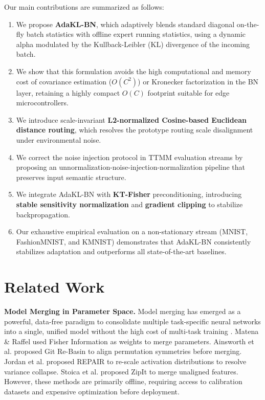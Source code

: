 \documentclass{article}
\begin{document}
Our main contributions are summarized as follows:
\begin{enumerate}
    \item We propose \textbf{AdaKL-BN}, which adaptively blends standard diagonal on-the-fly batch statistics with offline expert running statistics, using a dynamic alpha modulated by the Kullback-Leibler (KL) divergence of the incoming batch.
    \item We show that this formulation avoids the high computational and memory cost of covariance estimation ($O(C^2)$) or Kronecker factorization in the BN layer, retaining a highly compact $O(C)$ footprint suitable for edge microcontrollers.
    \item We introduce scale-invariant \textbf{L2-normalized Cosine-based Euclidean distance routing}, which resolves the prototype routing scale disalignment under environmental noise.
    \item We correct the noise injection protocol in TTMM evaluation streams by proposing an unnormalization-noise-injection-normalization pipeline that preserves input semantic structure.
    \item We integrate AdaKL-BN with \textbf{KT-Fisher} preconditioning, introducing \textbf{stable sensitivity normalization} and \textbf{gradient clipping} to stabilize backpropagation.
    \item Our exhaustive empirical evaluation on a non-stationary stream (MNIST, FashionMNIST, and KMNIST) demonstrates that AdaKL-BN consistently stabilizes adaptation and outperforms all state-of-the-art baselines.
\end{enumerate}

\section{Related Work}
\label{sec:related}

\textbf{Model Merging in Parameter Space.} Model merging has emerged as a powerful, data-free paradigm to consolidate multiple task-specific neural networks into a single, unified model without the high cost of multi-task training \cite{matena21, ainsworth22, stoica23}. Matena \& Raffel \cite{matena21} used Fisher Information as weights to merge parameters. Ainsworth et al. \cite{ainsworth22} proposed Git Re-Basin to align permutation symmetries before merging. Jordan et al. \cite{jordan22} proposed REPAIR to re-scale activation distributions to resolve variance collapse. Stoica et al. \cite{stoica23} proposed ZipIt to merge unaligned features. However, these methods are primarily offline, requiring access to calibration datasets and expensive optimization before deployment.
\end{document}
